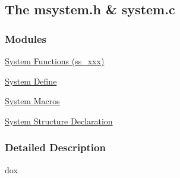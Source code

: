\subsection{The msystem.h \& system.c}
\label{group__msystemincludecode}
\subsubsection*{Modules}
\begin{DoxyCompactItemize}
\item 
\hyperlink{group__msfunctionc}{System Functions (ss\_\-xxx)}
\item 
\hyperlink{group__msdefineh}{System Define}
\item 
\hyperlink{group__msmacroh}{System Macros}
\item 
\hyperlink{group__mssectionh}{System Structure Declaration}
\end{DoxyCompactItemize}


\subsubsection{Detailed Description}
dox 